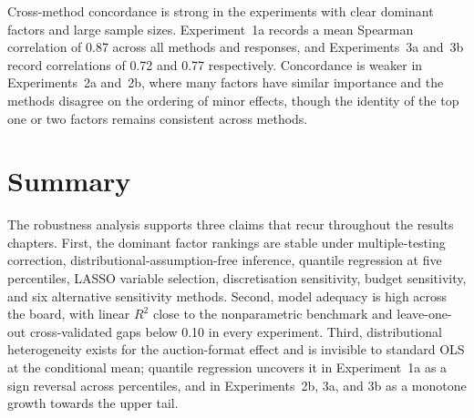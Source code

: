 Cross-method concordance is strong in the experiments with clear dominant factors and large sample sizes. Experiment~1a records a mean Spearman correlation of 0.87 across all methods and responses, and Experiments~3a and~3b record correlations of 0.72 and 0.77 respectively. Concordance is weaker in Experiments~2a and~2b, where many factors have similar importance and the methods disagree on the ordering of minor effects, though the identity of the top one or two factors remains consistent across methods.

\section{Summary}
\label{sec:app_summary}

The robustness analysis supports three claims that recur throughout the results chapters. First, the dominant factor rankings are stable under multiple-testing correction, distributional-assumption-free inference, quantile regression at five percentiles, LASSO variable selection, discretisation sensitivity, budget sensitivity, and six alternative sensitivity methods. Second, model adequacy is high across the board, with linear $R^2$ close to the nonparametric benchmark and leave-one-out cross-validated gaps below 0.10 in every experiment. Third, distributional heterogeneity exists for the auction-format effect and is invisible to standard OLS at the conditional mean; quantile regression uncovers it in Experiment~1a as a sign reversal across percentiles, and in Experiments~2b, 3a, and 3b as a monotone growth towards the upper tail.
